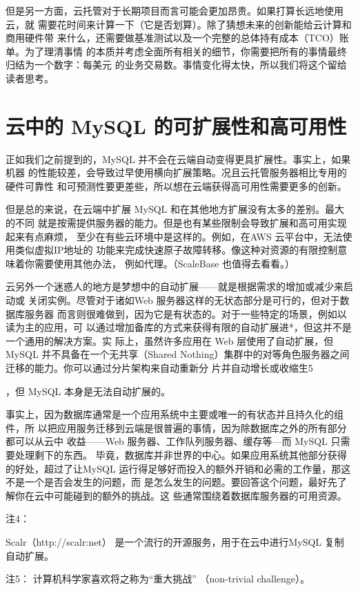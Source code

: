 但是另一方面，云托管对于长期项目而言可能会更加昂贵。如果打算长远地使用云，就
需要花时间来计算一下（它是否划算）。除了猜想未来的创新能给云计算和商用硬件带
来什么，还需要做基准测试以及一个完整的总体持有成本（TCO）账单。为了理清事情
的本质并考虑全面所有相关的细节，你需要把所有的事情最终归结为一个数字：每美元
的业务交易数。事情变化得太快，所以我们将这个留给读者思考。

\section{云中的 MySQL 的可扩展性和高可用性}
正如我们之前提到的，MySQL 并不会在云端自动变得更具扩展性。事实上，如果机器
的性能较差，会导致过早使用横向扩展策略。况且云托管服务器相比专用的硬件可靠性
和可预测性要更差些，所以想在云端获得高可用性需要更多的创新。

但是总的来说，在云端中扩展 MySQL 和在其他地方扩展没有太多的差别。最大的不同
就是按需提供服务器的能力。但是也有某些限制会导致扩展和高可用实现起来有点麻烦，
至少在有些云环境中是这样的。例如，在AWS 云平台中，无法使用类似虚拟IP地址的
功能来完成快速原子故障转移。像这种对资源的有限控制意味着你需要使用其他办法，
例如代理。（ScaleBase 也值得去看看。）

云另外一个迷惑人的地方是梦想中的自动扩展——就是根据需求的增加或减少来启动或
关闭实例。尽管对于诸如Web 服务器这样的无状态部分是可行的，但对于数据库服务器
而言则很难做到，因为它是有状态的。对于一些特定的场景，例如以读为主的应用，可
以通过增加备库的方式来获得有限的自动扩展进*，但这并不是一个通用的解决方案。实
际上，虽然许多应用在 Web 层使用了自动扩展，但 MySQL 并不具备在一个无共享（Shared
Nothing）集群中的对等角色服务器之间迁移的能力。你可以通过分片架构来自动重新分
片并自动增长或收缩生5

，但 MySQL 本身是无法自动扩展的。

事实上，因为数据库通常是一个应用系统中主要或唯一的有状态并且持久化的组件，所
以把应用服务迁移到云端是很普遍的事情，因为除数据库之外的所有部分都可以从云中
收益——Web 服务器、工作队列服务器、缓存等—而 MySQL 只需要处理剩下的东西。
毕竟，数据库并非世界的中心。如果应用系统其他部分获得的好处，超过了让MySQL
运行得足够好而投入的额外开销和必需的工作量，那这不是一个是否会发生的问题，而
是怎么发生的问题。要回答这个问题，最好先了解你在云中可能碰到的额外的挑战。这
些通常围绕着数据库服务器的可用资源。

注4：

Scalr（http://scalr:net） 是一个流行的开源服务，用于在云中进行MySQL 复制自动扩展。

注5： 计算机科学家喜欢将之称为“重大挑战” （non-trivial challenge）。

